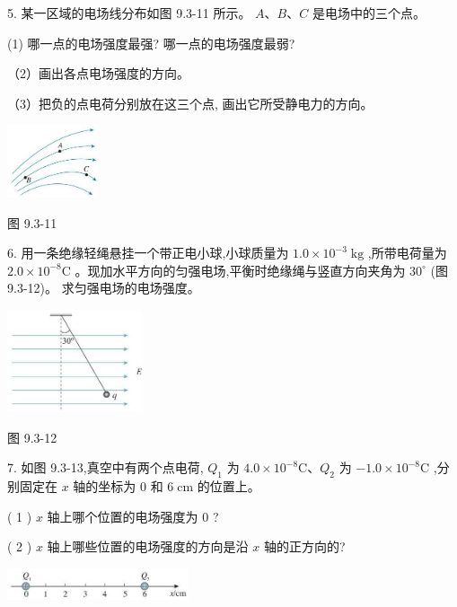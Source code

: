 \documentclass[10pt]{article}
\begin{document}
5. 某一区域的电场线分布如图 9.3-11 所示。 \(A\text{、}B\text{、}C\) 是电场中的三个点。

(1) 哪一点的电场强度最强? 哪一点的电场强度最弱?

（2）画出各点电场强度的方向。

（3）把负的点电荷分别放在这三个点, 画出它所受静电力的方向。

\begin{center}
\includegraphics[max width=0.2\textwidth]{images/01911d5f-8e38-70c0-b5b8-2b399bd115b6_22_520054.jpg}
\end{center}

图 9.3-11

6. 用一条绝缘轻绳悬挂一个带正电小球,小球质量为 \({1.0} \times {10}^{-3}\mathrm{\;{kg}}\) ,所带电荷量为 \({2.0} \times {10}^{-8}\mathrm{C}\) 。现加水平方向的匀强电场,平衡时绝缘绳与竖直方向夹角为 \({30}^{ \circ }\) (图 9.3-12)。 求匀强电场的电场强度。

\begin{center}
\includegraphics[max width=0.3\textwidth]{images/01911d5f-8e38-70c0-b5b8-2b399bd115b6_22_544707.jpg}
\end{center}

图 9.3-12

7. 如图 9.3-13,真空中有两个点电荷, \({Q}_{1}\) 为 \({4.0} \times {10}^{-8}\mathrm{C}\text{、}{Q}_{2}\) 为 \(- {1.0} \times {10}^{-8}\mathrm{C}\) ,分别固定在 \(x\) 轴的坐标为 0 和 \(6\mathrm{\;{cm}}\) 的位置上。

( 1 ) \(x\) 轴上哪个位置的电场强度为 0 ?

( 2 ) \(x\) 轴上哪些位置的电场强度的方向是沿 \(x\) 轴的正方向的?

\begin{center}
\includegraphics[max width=0.4\textwidth]{images/01911d5f-8e38-70c0-b5b8-2b399bd115b6_22_970352.jpg}
\end{center}
\end{document}

